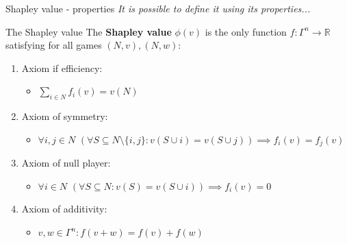 \documentclass{beamer}
\begin{document}
\begin{frame}{Shapley value - properties}
    \pause
    \textit{It is possible to define it using its properties...}
	\pause
    \begin{block}{The Shapley value}
       The \textbf{Shapley value} $\phi(v)$ is the only function $f \colon \Gamma^n \to \mathbb{R}$ satisfying for all games $(N,v),(N,w)$:
        \begin{enumerate}
            \pause
            \item Axiom if efficiency:
            \begin{itemize}
                \item $\sum_{i \in N}f_i(v) = v(N)$
            \end{itemize}
            \pause
            \item Axiom of symmetry:
            \begin{itemize}
                \item$\forall i,j \in N$ $(\forall S \subseteq N \setminus \{i,j\}: v(S \cup i) = v(S \cup j)) \implies f_i(v) = f_j(v)$
            \end{itemize}
            \pause
            \item Axiom of null player:
            \begin{itemize}
                \item $\forall i \in N$ $(\forall S \subseteq N: v(S) = v(S \cup i)) \implies f_i(v)=0$
            \end{itemize}
            \pause
            \item Axiom of additivity:
            \begin{itemize}
                \item $v,w \in \Gamma^n: f(v+w)=f(v)+f(w)$
            \end{itemize}
        \end{enumerate}

    \end{block}
\end{frame}


\end{document}
